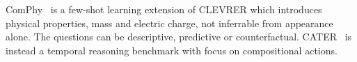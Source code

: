 ComPhy~\cite{chen2021comphy} is a few-shot learning extension of CLEVRER which introduces physical properties, mass and electric charge, not inferrable from appearance alone.
The questions can be descriptive, predictive or counterfactual. %
%
CATER~\cite{girdhar2019cater} is instead a temporal reasoning benchmark with focus on compositional actions.
